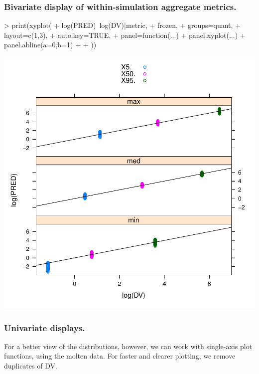 \subsubsection{Bivariate display of within-simulation aggregate metrics.}
\begin{Schunk}
\begin{Sinput}
> print(xyplot(
+ 	log(PRED)~log(DV)|metric,
+ 	frozen,
+ 	groups=quant,
+ 	layout=c(1,3),
+ 	auto.key=TRUE,
+ 	panel=function(...){
+ 		panel.xyplot(...)
+ 		panel.abline(a=0,b=1)
+ 	}
+ ))
\end{Sinput}
\end{Schunk}
\includegraphics{model-bivariate}
\subsubsection{Univariate displays.}
For a better view of the distributions, however, we can work with single-axis plot functions,
using the molten data.  For faster and clearer plotting, we remove duplicates of DV.
